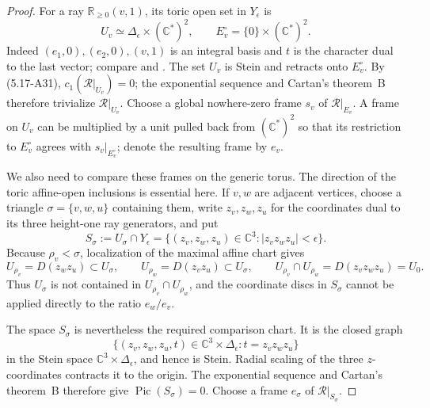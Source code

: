 \begin{proof}
For a ray \(\mathbb R_{\ge0}(v,1)\), its toric open set in
\(Y_\epsilon\) is
\[
 U_v\simeq\Delta_\epsilon\times(\mathbb C^*)^2,
 \qquad E_v^\circ=\{0\}\times(\mathbb C^*)^2.
\tag{5.17-A34}
\]
Indeed \((e_1,0),(e_2,0),(v,1)\) is an integral basis and \(t\) is the
character dual to the last vector; compare
\cite[\S2.1, pp.~28--29]{Fulton1993} and
\cite[Example~1.2.21, p.~31]{CoxLittleSchenck2011}.
The set \(U_v\) is Stein and retracts
onto \(E_v^\circ\).  By (5.17-A31),
\(c_1(\mathcal R|_{U_v})=0\); the exponential sequence and Cartan's
theorem~B therefore trivialize \(\mathcal R|_{U_v}\).  Choose a global
nowhere-zero frame \(s_v\) of \(\mathcal R|_{E_v}\).  A frame on \(U_v\) can be
multiplied by a unit pulled back from \((\mathbb C^*)^2\) so that its
restriction to \(E_v^\circ\) agrees with \(s_v|_{E_v^\circ}\); denote the
resulting frame by \(e_v\).

We also need to compare these frames on the generic torus.  The direction
of the toric affine-open inclusions is essential here.  If \(v,w\) are
adjacent vertices, choose a triangle \(\sigma=\{v,w,u\}\) containing them,
write \(z_v,z_w,z_u\) for the coordinates dual to its three height-one ray
generators, and put
\[
 S_\sigma:=U_\sigma\cap Y_\epsilon
 =\{(z_v,z_w,z_u)\in\mathbb C^3:
       |z_vz_wz_u|<\epsilon\}.
\tag{5.17-A34a}
\]
Because \(\rho_v<\sigma\), localization of the maximal affine chart gives
\begin{equation}
 U_{\rho_v}=D(z_wz_u)\subset U_\sigma,\qquad
 U_{\rho_w}=D(z_vz_u)\subset U_\sigma,\qquad
 U_{\rho_v}\cap U_{\rho_w}=D(z_vz_wz_u)=U_0.
\label{eq:analytic-toric-open-directions}
\end{equation}
Thus \(U_\sigma\) is not contained in \(U_{\rho_v}\cap U_{\rho_w}\), and
the coordinate discs in \(S_\sigma\) cannot be applied directly to the
ratio \(e_w/e_v\).

The space \(S_\sigma\) is nevertheless the required comparison chart.  It
is the closed graph
\[
 \{(z_v,z_w,z_u,t)\in\mathbb C^3\times\Delta_\epsilon:
   t=z_vz_wz_u\}
\]
in the Stein space \(\mathbb C^3\times\Delta_\epsilon\), and hence is
Stein.  Radial scaling of the three \(z\)-coordinates contracts it to the
origin.  The exponential sequence and Cartan's theorem~B therefore give
\(\operatorname{Pic}(S_\sigma)=0\).  Choose a frame \(e_\sigma\) of
\(\mathcal R|_{S_\sigma}\).


\end{proof}
